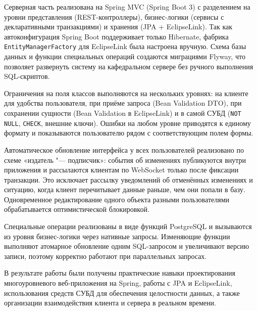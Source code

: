 \documentclass[a4paper,12pt]{article}
\begin{document}
Серверная часть реализована на Spring MVC (Spring Boot 3) с разделением на уровни представления (REST-контроллеры), бизнес-логики (сервисы с декларативными транзакциями) и хранения (JPA + EclipseLink). Так как автоконфигурация Spring Boot поддерживает только Hibernate, фабрика \texttt{EntityManagerFactory} для EclipseLink была настроена вручную. Схема базы данных и функции специальных операций создаются миграциями Flyway, что позволяет развернуть систему на кафедральном сервере без ручного выполнения SQL-скриптов.

Ограничения на поля классов выполняются на нескольких уровнях: на клиенте для удобства пользователя, при приёме запроса (Bean Validation DTO), при сохранении сущности (Bean Validation в EclipseLink) и в самой СУБД (\texttt{NOT NULL}, \texttt{CHECK}, внешние ключи). Ошибки на любом уровне приводятся к единому формату и показываются пользователю рядом с соответствующим полем формы.

Автоматическое обновление интерфейса у всех пользователей реализовано по схеме «издатель "--- подписчик»: события об изменениях публикуются внутри приложения и рассылаются клиентам по WebSocket только после фиксации транзакции. Это исключает рассылку уведомлений об отменённых изменениях и ситуацию, когда клиент перечитывает данные раньше, чем они попали в базу. Одновременное редактирование одного объекта разными пользователями обрабатывается оптимистической блокировкой.

Специальные операции реализованы в виде функций PostgreSQL и вызываются из уровня бизнес-логики через нативные запросы. Изменяющие функции выполняют атомарное обновление одним SQL-запросом и увеличивают версию записи, поэтому корректно работают при параллельных запросах.

В результате работы были получены практические навыки проектирования многоуровневого веб-приложения на Spring, работы с JPA и EclipseLink, использования средств СУБД для обеспечения целостности данных, а также организации взаимодействия клиента и сервера в реальном времени.
\end{document}
